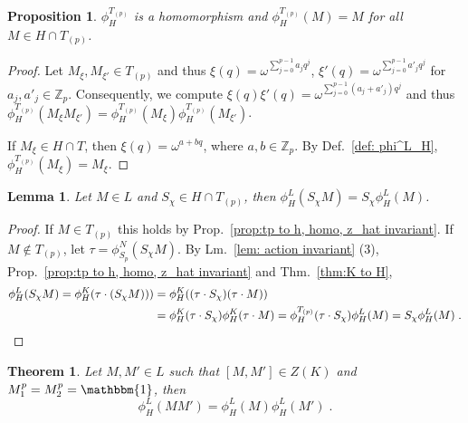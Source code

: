 \documentclass[aps,pra,letterpaper,onrcolumn,nofootinbib,notitlepage,longbibliography]{revtex4-1}
\newtheorem{theorem}{Theorem}
\newtheorem{proposition}{Proposition}
\newtheorem{lemma}{Lemma}
\newcommand{\one}{\mathbbm{1}}
\newcommand{\Z}{\mathbb Z}
\begin{document}
\begin{proposition}{\label{prop:tp to h, homo, z_hat invariant}}
    $\phi^{T_{(p)}}_H$ is a homomorphism and $\phi^{T_{(p)}}_H(M)=M$ for all $M\in H\cap T_{(p)}$.
\end{proposition}

\begin{proof}
    Let $M_\xi,M_{\xi'}\in T_{(p)}$ and thus $\xi(q)=\omega^{\sum_{j=0}^{p-1} a_jq^j}$,  $\xi'(q)=\omega^{\sum_{j=0}^{p-1} a'_jq^j}$ for $a_j,a'_j\in\Z_p$. Consequently, we compute $\xi(q)\xi'(q)=\omega^{\sum_{j=0}^{p-1}(a_j+a'_j)q^j}$ and thus $\phi^{T_{(p)}}_H(M_\xi M_{\xi'})=\phi^{T_{(p)}}_H(M_\xi)\phi^{T_{(p)}}_H(M_{\xi'})$. 
    
    If $M_\xi\in H \cap T$, then $\xi(q)=\omega^{a+bq}$, where $a,b\in\Z_p$. By Def.~\ref{def: phi^L_H}, $\phi^{T_{(p)}}_H(M_\xi)=M_\xi$.
\end{proof}


\begin{lemma}{\label{lem: s_chi pull out}}
     Let $M\in L$ and $S_\chi\in H\cap T_{(p)}$, then
     $\phi^L_H(S_\chi M)=S_\chi\phi^L_H(M)$.
\end{lemma}
\begin{proof}
    If $M\in T_{(p)}$ this holds by Prop.~\ref{prop:tp to h, homo, z_hat invariant}. If $M\not\in T_{(p)}$, let $\tau=\phi^N_{S_p}(S_\chi M)$. By Lm.~\ref{lem: action invariant} (3), Prop.~\ref{prop:tp to h, homo, z_hat invariant} and Thm.~\ref{thm:K to H},
    \begin{align*}
        \phi^L_H(S_\chi M)
        =\phi^K_H(\tau\cdot (S_\chi M)))
        &=\phi^K_H((\tau\cdot S_\chi)(\tau\cdot M))\\
        &=\phi^K_H(\tau\cdot S_\chi)\phi^K_H(\tau\cdot M)
        =\phi^{T_{(p)}}_H(\tau\cdot S_\chi)\phi^L_H(M)
        =S_\chi\phi^L_H(M)\; .\qedhere
    \end{align*}
\end{proof}

\begin{theorem}{\label{thm: main L to H}}
    Let $M,M'\in L$ such that $[M,M']\in Z(K)$ and $M^p_1=M^p_2=\one$, then
    $$\phi^L_H(MM')=\phi^L_H(M)\phi^L_H(M')\; .$$
\end{theorem}
\end{document}
